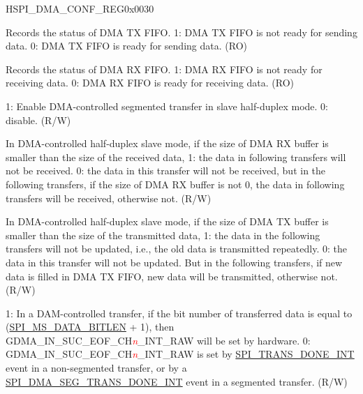 \begin{register}{H}{SPI\_DMA\_CONF\_REG}{0x{}0030}\label{regdesc:SPIDMACONFREG}
%
%
%
%
%
%
%
%
%
%
%
%
%
\regnewline%
\begin{regdesc}\begin{reglist}
\label{fielddesc:SPIDMAOUTFIFOEMPTY}\item [SPI\_DMA\_OUTFIFO\_EMPTY] Records the status of DMA TX FIFO. 1: DMA TX FIFO is not ready for sending data. 0: DMA TX FIFO is ready for sending data. (RO)
\label{fielddesc:SPIDMAINFIFOFULL}\item [SPI\_DMA\_INFIFO\_FULL] Records the status of DMA RX FIFO. 1: DMA RX FIFO is not ready for receiving data. 0: DMA RX FIFO is ready for receiving data. (RO)
\label{fielddesc:SPIDMASLVSEGTRANSEN}\item [SPI\_DMA\_SLV\_SEG\_TRANS\_EN] 1: Enable DMA-controlled segmented transfer in slave half-duplex mode. 0: disable. (R/W)
\label{fielddesc:SPISLVRXSEGTRANSCLREN}\item [SPI\_SLV\_RX\_SEG\_TRANS\_CLR\_EN] In DMA-controlled half-duplex slave mode, if the size of DMA RX buffer is smaller than the size of the received data, 1: the data in following transfers will not be received. 0: the data in this transfer will not be received, but in the following transfers, if the size of DMA RX buffer is not 0, the data in following transfers will be received, otherwise not. (R/W)
\label{fielddesc:SPISLVTXSEGTRANSCLREN}\item [SPI\_SLV\_TX\_SEG\_TRANS\_CLR\_EN] In DMA-controlled half-duplex slave mode, if the size of DMA TX buffer is smaller than the size of the transmitted data, 1: the data in the following transfers will not be updated, i.e., the old data is transmitted repeatedly. 0: the data in this transfer will not be updated. But in the following transfers, if new data is filled in DMA TX FIFO, new data will be transmitted, otherwise not. (R/W)
\label{fielddesc:SPIRXEOFEN}\item [SPI\_RX\_EOF\_EN] 1: In a DAM-controlled transfer, if the bit number of
transferred data is equal to (\hyperref[fielddesc:SPIMSDATABITLEN]{SPI\_MS\_DATA\_BITLEN} + 1), then GDMA\_IN\_SUC\_EOF\_CH\textcolor{red}{\it{n}}\_INT\_RAW will be set by hardware. 0: GDMA\_IN\_SUC\_EOF\_CH\textcolor{red}{\it{n}}\_INT\_RAW is set by \hyperref[int:SPITRANSDONEINT]{SPI\_TRANS\_DONE\_INT} event in a non-segmented transfer, or by a \hyperref[int:SPIDMASEGTRANSDONEINT]{SPI\_DMA\_SEG\_TRANS\_DONE\_INT} event in a segmented transfer. (R/W)


\end{reglist}
\end{regdesc}
\end{register}
